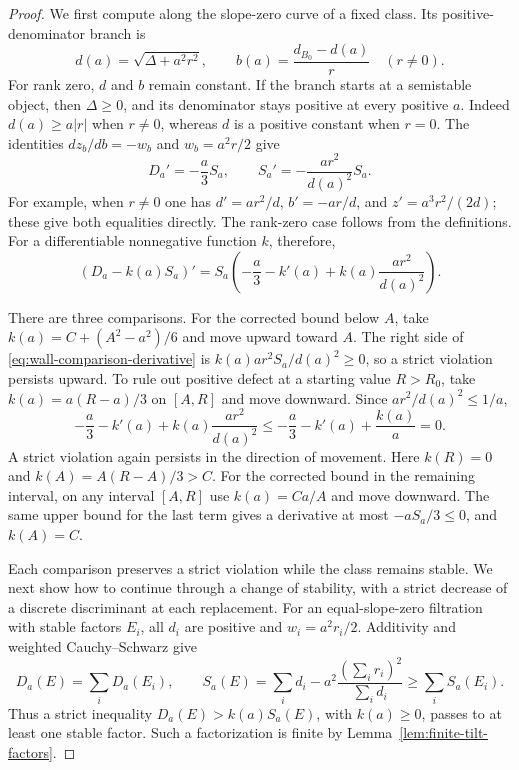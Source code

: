 \begin{proof}
We first compute along the slope-zero curve of a fixed class.  Its
positive-denominator branch is
\begin{equation}\label{eq:zero-branch}
 d(a)=\sqrt{\Delta+a^2r^2},\qquad
 b(a)=\frac{d_{B_0}-d(a)}r\quad(r\ne0).
\end{equation}
For rank zero, $d$ and $b$ remain constant.  If the branch starts at
a semistable object, then $\Delta\ge0$, and its denominator stays
positive at every positive $a$.  Indeed $d(a)\ge a|r|$ when
$r\ne0$, whereas $d$ is a positive constant when $r=0$.
The identities $dz_b/db=-w_b$ and $w_b=a^2r/2$ give
\begin{equation}\label{eq:wall-derivatives}
 D_a'=-\frac a3S_a,\qquad
 S_a'=-\frac{ar^2}{d(a)^2}S_a.
\end{equation}
For example, when $r\ne0$ one has $d'=ar^2/d$,
$b'=-ar/d$, and $z'=a^3r^2/(2d)$; these give both equalities
directly.  The rank-zero case follows from the definitions.
For a differentiable nonnegative function $k$, therefore,
\begin{equation}\label{eq:wall-comparison-derivative}
 (D_a-k(a)S_a)'=
 S_a\left(-\frac a3-k'(a)+k(a)\frac{ar^2}{d(a)^2}\right).
\end{equation}

There are three comparisons.  For the corrected bound below $A$,
take $k(a)=C+(A^2-a^2)/6$ and move upward toward
$A$.  The right side of \eqref{eq:wall-comparison-derivative} is
$k(a)ar^2S_a/d(a)^2\ge0$, so a strict violation persists upward.
To rule out positive defect at a starting value $R>R_0$, take
$k(a)=a(R-a)/3$ on $[A,R]$ and move downward.  Since
$ar^2/d(a)^2\le1/a$,
\[
 -\frac a3-k'(a)+k(a)\frac{ar^2}{d(a)^2}
 \le-\frac a3-k'(a)+\frac{k(a)}a=0.
\]
A strict violation again persists in the direction of movement.
Here $k(R)=0$ and $k(A)=A(R-A)/3>C$.
For the corrected bound in the remaining interval, on any
interval $[A,R]$ use $k(a)=Ca/A$ and move
downward.  The same upper bound for the last term gives a derivative
at most $-aS_a/3\le0$, and $k(A)=C$.

Each comparison preserves a strict violation while the class remains
stable.  We next show how to continue through a change of stability,
with a strict decrease of a discrete discriminant at each replacement.
For an equal-slope-zero filtration with stable factors $E_i$,
all $d_i$ are positive and $w_i=a^2r_i/2$.  Additivity and
weighted Cauchy--Schwarz give
\begin{equation}\label{eq:wall-additivity}
 D_a(E)=\sum_iD_a(E_i),\qquad
 S_a(E)=\sum_i d_i-a^2\frac{(\sum_i r_i)^2}{\sum_i d_i}
        \ge\sum_iS_a(E_i).
\end{equation}
Thus a strict inequality $D_a(E)>k(a)S_a(E)$, with $k(a)\ge0$,
passes to at least one stable factor.  Such a factorization is finite
by Lemma~\ref{lem:finite-tilt-factors}.


\end{proof}
